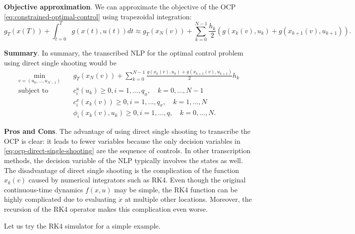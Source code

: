\documentclass[
]{book}
\theoremstyle{definition}
\theoremstyle{definition}
\theoremstyle{definition}
\theoremstyle{definition}
\theoremstyle{remark}
\begin{document}
\textbf{Objective approximation}. We can approximate the objective of the OCP \eqref{eq:constrained-optimal-control} using trapezoidal integration:
\[
g_T(x(T)) + \int_{t=0}^T g(x(t),u(t)) dt \approx g_T(x_N(v)) + \sum_{k=0}^{N-1} \frac{h_k}{2}(g(x_k(v),u_k) + g(x_{k+1}(v),u_{k+1})).
\]

\textbf{Summary}. In summary, the transcribed NLP for the optimal control problem using direct single shooting would be
\begin{equation}
\begin{split}
\min_{v = (u_0,\dots,u_{N-1})} & \quad g_T(x_N(v)) + \sum_{k=0}^{N-1} \frac{g(x_k(v),u_k) + g(x_{k+1}(v), u_{k+1})}{2} h_k \\
\text{subject to} & \quad c^u_i(u_k) \geq 0, i=1,\dots,q_u, \quad k=0,\dots,N-1 \\
& \quad c^x_i(x_k(v)) \geq 0, i=1,\dots,q_x, \quad k=1,\dots,N \\
& \quad \phi_i(x_k(v),u_k) \geq 0, i=1,\dots, q, \quad k=0,\dots,N.
\end{split}
\label{eq:ocp-direct-single-shooting}
\end{equation}

\textbf{Pros and Cons}. The advantage of using direct single shooting to transcribe the OCP is clear: it leads to fewer variables because the only decision variables in \eqref{eq:ocp-direct-single-shooting} are the sequence of controls. In other transcription methods, the decision variable of the NLP typically involves the states as well. The disadvantage of direct single shooting is the complication of the function \(x_k(v)\) caused by numerical integrators such as RK4. Even though the original continuous-time dynamics \(f(x,u)\) may be simple, the RK4 function can be highly complicated due to evaluating \(\dot{x}\) at multiple other locations. Moreover, the recursion of the RK4 operator makes this complication even worse.

Let us try the RK4 simulator for a simple example.
\end{document}
